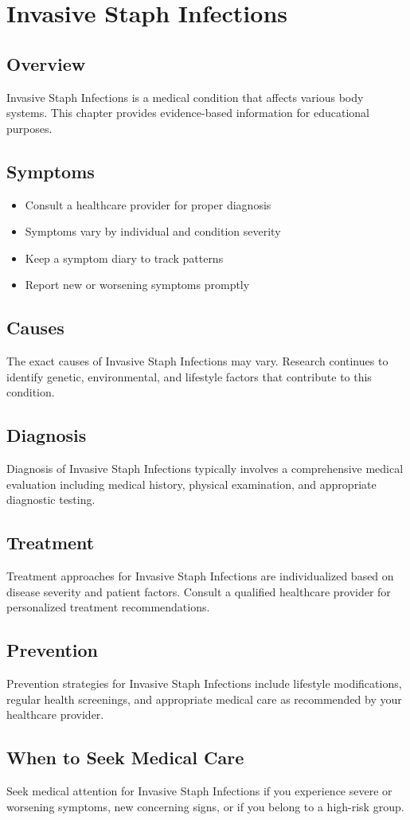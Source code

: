 \chapter{Invasive Staph Infections}

\section*{Overview}
Invasive Staph Infections is a medical condition that affects various body systems. This chapter provides evidence-based information for educational purposes.

\section*{Symptoms}
\begin{itemize}
  \item Consult a healthcare provider for proper diagnosis
  \item Symptoms vary by individual and condition severity
  \item Keep a symptom diary to track patterns
  \item Report new or worsening symptoms promptly
\end{itemize}

\section*{Causes}
The exact causes of Invasive Staph Infections may vary. Research continues to identify genetic, environmental, and lifestyle factors that contribute to this condition.

\section*{Diagnosis}
Diagnosis of Invasive Staph Infections typically involves a comprehensive medical evaluation including medical history, physical examination, and appropriate diagnostic testing.

\section*{Treatment}
Treatment approaches for Invasive Staph Infections are individualized based on disease severity and patient factors. Consult a qualified healthcare provider for personalized treatment recommendations.

\section*{Prevention}
Prevention strategies for Invasive Staph Infections include lifestyle modifications, regular health screenings, and appropriate medical care as recommended by your healthcare provider.

\section*{When to Seek Medical Care}
Seek medical attention for Invasive Staph Infections if you experience severe or worsening symptoms, new concerning signs, or if you belong to a high-risk group.
\clearpage
